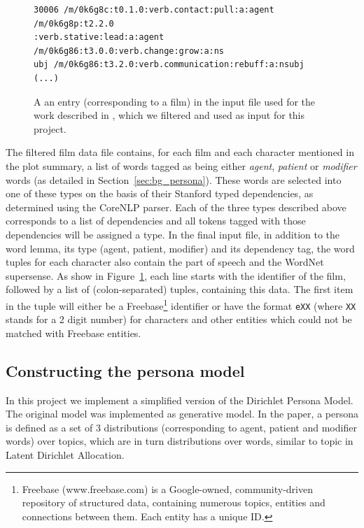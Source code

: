 \documentclass[bsc,frontabs,singlespacing,parskip, twoside]{infthesis}
\begin{document}
\begin{figure}[h]
\centering
\begin{minipage}{14.5cm}
\begin{Verbatim}[frame=single]
30006 /m/0k6g8c:t0.1.0:verb.contact:pull:a:agent /m/0k6g8p:t2.2.0
:verb.stative:lead:a:agent /m/0k6g86:t3.0.0:verb.change:grow:a:ns
ubj /m/0k6g86:t3.2.0:verb.communication:rebuff:a:nsubj (...)
\end{Verbatim}
\end{minipage}
\caption{A an entry (corresponding to a film) in the input file used for the work described in \cite{Bamman2013}, which we filtered and used as input for this project.}
\label{fig:bamman_input}
\end{figure}


The filtered film data file contains, for each film and each character mentioned in the plot summary, a list of words tagged as being either \textit{agent}, \textit{patient} or \textit{modifier} words (as detailed in Section~\ref{sec:bg_persona}). These words are selected into one of these types on the basis of their Stanford typed dependencies, as determined using the CoreNLP parser. Each of the three types described above corresponds to a list of dependencies and all tokens tagged with those dependencies will be assigned a type. In the final input file, in addition to the word lemma, its type (agent, patient, modifier) and its dependency tag, the word tuples for each character also contain the part of speech and the WordNet supersense. As show in Figure~\ref{fig:bamman_input}, each line starts with the identifier of the film, followed by a list of (colon-separated) tuples, containing this data. The first item in the tuple will either be a Freebase\footnote{Freebase (www.freebase.com) is a Google-owned, community-driven repository of structured data, containing numerous topics, entities and connections between them. Each entity has a unique ID.} identifier or have the format \texttt{eXX} (where \texttt{XX} stands for a 2 digit number) for characters and other entities which could not be matched with Freebase entities.


\subsection{Constructing the persona model}
In this project we implement a simplified version of the Dirichlet Persona Model. The original model was implemented as generative model. In the paper, a persona is defined as a set of 3 distributions (corresponding to agent, patient and modifier words) over topics, which are in turn distributions over words, similar to topic in Latent Dirichlet Allocation.
\end{document}

